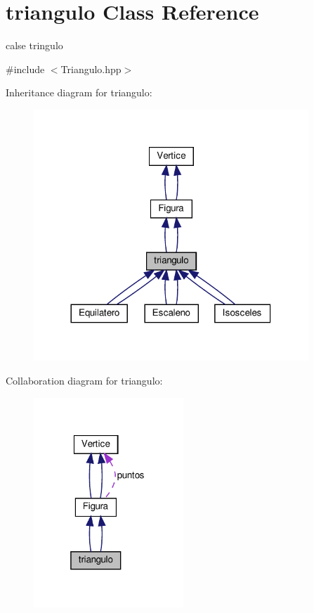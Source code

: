 \hypertarget{classtriangulo}{}\section{triangulo Class Reference}
\label{classtriangulo}


calse tringulo  




{\ttfamily \#include $<$Triangulo.\+hpp$>$}



Inheritance diagram for triangulo\+:
\nopagebreak
\begin{figure}[H]
\begin{center}
\leavevmode
\includegraphics[width=293pt]{classtriangulo__inherit__graph}
\end{center}
\end{figure}


Collaboration diagram for triangulo\+:
\nopagebreak
\begin{figure}[H]
\begin{center}
\leavevmode
\includegraphics[width=160pt]{classtriangulo__coll__graph}
\end{center}
\end{figure}
